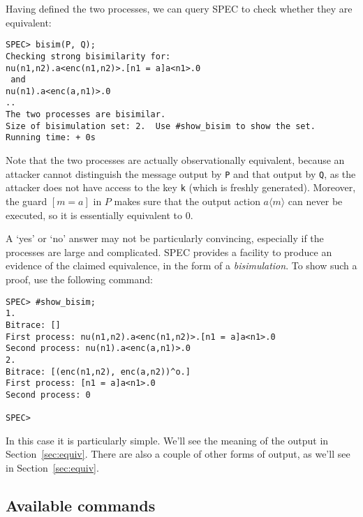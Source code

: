 \documentclass{article}
\begin{document}
Having defined the two processes, we can query SPEC to check whether they are
equivalent:

\begin{verbatim}
SPEC> bisim(P, Q);
Checking strong bisimilarity for: 
nu(n1,n2).a<enc(n1,n2)>.[n1 = a]a<n1>.0
 and 
nu(n1).a<enc(a,n1)>.0
..
The two processes are bisimilar.
Size of bisimulation set: 2.  Use #show_bisim to show the set.
Running time: + 0s
\end{verbatim}

Note that the two processes are actually observationally equivalent, because
an attacker cannot distinguish the message output by \texttt{P} and
that output by \texttt{Q}, as the attacker does not have access to the
key \texttt{k} (which is freshly generated). Moreover, the guard $[m = a]$ in
$P$ makes sure that the output action $a\langle m \rangle$ can never
be executed, so it is essentially equivalent to $0$.

A `yes' or `no' answer may not be particularly convincing, especially if the processes are
large and complicated. SPEC provides a facility to produce an evidence of the
claimed equivalence, in the form of a {\em bisimulation}. To show such a 
proof, use the following command:

\begin{verbatim}
SPEC> #show_bisim;     
1. 
Bitrace: []
First process: nu(n1,n2).a<enc(n1,n2)>.[n1 = a]a<n1>.0
Second process: nu(n1).a<enc(a,n1)>.0
2. 
Bitrace: [(enc(n1,n2), enc(a,n2))^o.]
First process: [n1 = a]a<n1>.0
Second process: 0

SPEC>
\end{verbatim}

In this case it is particularly simple. 
We'll see the meaning of the output in Section~\ref{sec:equiv}. 
There are also a couple of other forms of output, as we'll see in Section~\ref{sec:equiv}. 

\subsection{Available commands}
\end{document}

